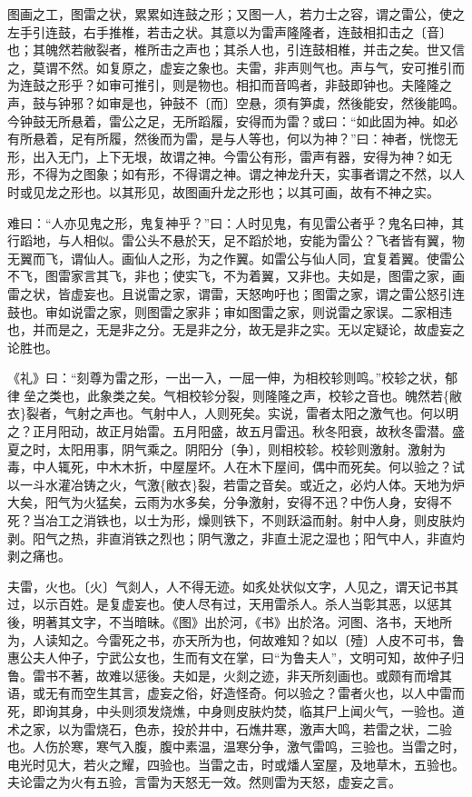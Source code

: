 \documentclass[]{article}
\begin{document}
图画之工，图雷之状，累累如连鼓之形；又图一人，若力士之容，谓之雷公，使之左手引连鼓，右手推椎，若击之状。其意以为雷声隆隆者，连鼓相扣击之〔音〕也；其魄然若敝裂者，椎所击之声也；其杀人也，引连鼓相椎，并击之矣。世又信之，莫谓不然。如复原之，虚妄之象也。夫雷，非声则气也。声与气，安可推引而为连鼓之形乎？如审可推引，则是物也。相扣而音鸣者，非鼓即钟也。夫隆隆之声，鼓与钟邪？如审是也，钟鼓不〔而〕空悬，须有笋虡，然後能安，然後能鸣。今钟鼓无所悬着，雷公之足，无所蹈履，安得而为雷？或曰：``如此固为神。如必有所悬着，足有所履，然後而为雷，是与人等也，何以为神？''曰：神者，恍惚无形，出入无门，上下无垠，故谓之神。今雷公有形，雷声有器，安得为神？如无形，不得为之图象；如有形，不得谓之神。谓之神龙升天，实事者谓之不然，以人时或见龙之形也。以其形见，故图画升龙之形也；以其可画，故有不神之实。

难曰：``人亦见鬼之形，鬼复神乎？''曰：人时见鬼，有见雷公者乎？鬼名曰神，其行蹈地，与人相似。雷公头不悬於天，足不蹈於地，安能为雷公？飞者皆有翼，物无翼而飞，谓仙人。画仙人之形，为之作翼。如雷公与仙人同，宜复着翼。使雷公不飞，图雷家言其飞，非也；使实飞，不为着翼，又非也。夫如是，图雷之家，画雷之状，皆虚妄也。且说雷之家，谓雷，天怒呴吁也；图雷之家，谓之雷公怒引连鼓也。审如说雷之家，则图雷之家非；审如图雷之家，则说雷之家误。二家相违也，并而是之，无是非之分。无是非之分，故无是非之实。无以定疑论，故虚妄之论胜也。

《礼》曰：``刻尊为雷之形，一出一入，一屈一伸，为相校轸则鸣。''校轸之状，郁律垒之类也，此象类之矣。气相校轸分裂，则隆隆之声，校轸之音也。魄然若\{敝衣\}裂者，气射之声也。气射中人，人则死矣。实说，雷者太阳之激气也。何以明之？正月阳动，故正月始雷。五月阳盛，故五月雷迅。秋冬阳衰，故秋冬雷潜。盛夏之时，太阳用事，阴气乘之。阴阳分〔争〕，则相校轸。校轸则激射。激射为毒，中人辄死，中木木折，中屋屋坏。人在木下屋间，偶中而死矣。何以验之？试以一斗水灌冶铸之火，气激\{敝衣\}裂，若雷之音矣。或近之，必灼人体。天地为炉大矣，阳气为火猛矣，云雨为水多矣，分争激射，安得不迅？中伤人身，安得不死？当冶工之消铁也，以士为形，燥则铁下，不则跃溢而射。射中人身，则皮肤灼剥。阳气之热，非直消铁之烈也；阴气激之，非直土泥之湿也；阳气中人，非直灼剥之痛也。

夫雷，火也。〔火〕气剡人，人不得无迹。如炙处状似文字，人见之，谓天记书其过，以示百姓。是复虚妄也。使人尽有过，天用雷杀人。杀人当彰其恶，以惩其後，明著其文字，不当暗昧。《图》出於河，《书》出於洛。河图、洛书，天地所为，人读知之。今雷死之书，亦天所为也，何故难知？如以〔殪〕人皮不可书，鲁惠公夫人仲子，宁武公女也，生而有文在掌，曰``为鲁夫人''，文明可知，故仲子归鲁。雷书不著，故难以惩後。夫如是，火剡之迹，非天所刻画也。或颇有而增其语，或无有而空生其言，虚妄之俗，好造怪奇。何以验之？雷者火也，以人中雷而死，即询其身，中头则须发烧燋，中身则皮肤灼焚，临其尸上闻火气，一验也。道术之家，以为雷烧石，色赤，投於井中，石燋井寒，激声大鸣，若雷之状，二验也。人伤於寒，寒气入腹，腹中素温，温寒分争，激气雷鸣，三验也。当雷之时，电光时见大，若火之耀，四验也。当雷之击，时或燔人室屋，及地草木，五验也。夫论雷之为火有五验，言雷为天怒无一效。然则雷为天怒，虚妄之言。
\end{document}
